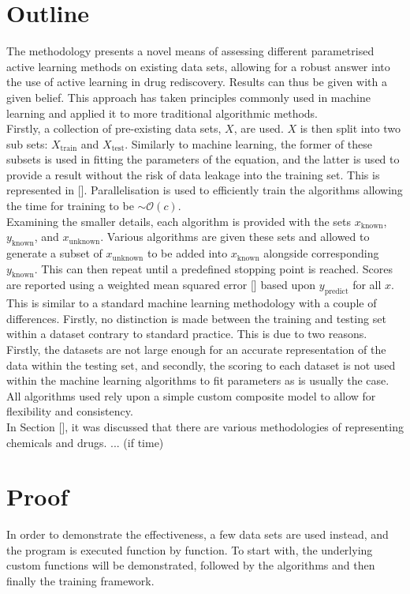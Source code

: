 \section{Outline}
The methodology presents a novel means of assessing different parametrised active learning methods on existing data sets, allowing for a robust answer into the use of active learning in drug rediscovery. Results can thus be given with a given belief. This approach has taken principles commonly used in machine learning and applied it to more traditional algorithmic methods.
\\
Firstly, a collection of pre-existing data sets, $X$, are used. $X$ is then split into two sub sets: $X_{\mathrm{train}}$ and $X_\mathrm{test}$. Similarly to machine learning, the former of these subsets is used in fitting the parameters of the equation, and the latter is used to provide a result without the risk of data leakage into the training set. This is represented in []. Parallelisation is used to efficiently train the algorithms allowing the time for training to be $\sim{}\mathcal{O}(c)$.
\\
Examining the smaller details, each algorithm is provided with the sets $x_\mathrm{known}$, $y_\mathrm{known}$, and $x_\mathrm{unknown}$. Various algorithms are given these sets and allowed to generate a subset of $x_\mathrm{unknown}$ to be added into $x_\mathrm{known}$ alongside corresponding $y_\mathrm{known}$. This can then repeat until a predefined stopping point is reached. Scores are reported using a weighted mean squared error [] based upon $y_\mathrm{predict}$ for all $x$. This is similar to a standard machine learning methodology with a couple of differences. Firstly, no distinction is made between the training and testing set within a dataset contrary to standard practice. This is due to two reasons. Firstly, the datasets are not large enough for an accurate representation of the data within the testing set, and secondly, the scoring to each dataset is not used within the machine learning algorithms to fit parameters as is usually the case. All algorithms used rely upon a simple custom composite model to allow for flexibility and consistency.
\\
In Section [], it was discussed that there are various methodologies of representing chemicals and drugs. ... (if time)
\section{Proof}
In order to demonstrate the effectiveness, a few data sets are used instead, and the program is executed function by function. To start with, the underlying custom functions will be demonstrated, followed by the algorithms and then finally the training framework.
